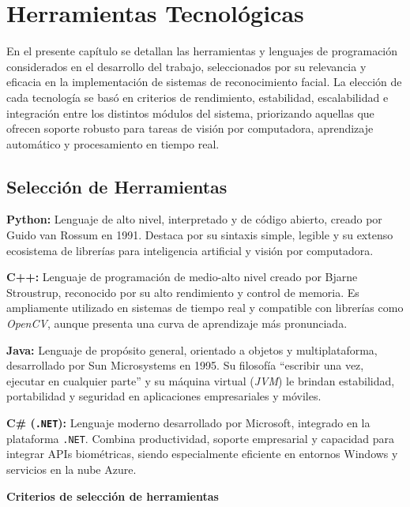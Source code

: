 \fancyhead{}
\fancyfoot{}
\cfoot{\thepage}



\chapter{Herramientas Tecnológicas}

En el presente capítulo se detallan las herramientas y lenguajes de programación considerados en el desarrollo del trabajo, seleccionados por su relevancia y eficacia en la implementación de sistemas de reconocimiento facial.  
La elección de cada tecnología se basó en criterios de rendimiento, estabilidad, escalabilidad e integración entre los distintos módulos del sistema, priorizando aquellas que ofrecen soporte robusto para tareas de visión por computadora, aprendizaje automático y procesamiento en tiempo real.   

\section{Selección de Herramientas}

\textbf{Python:} Lenguaje de alto nivel, interpretado y de código abierto, creado por Guido van Rossum en 1991. Destaca por su sintaxis simple, legible y su extenso ecosistema de librerías para inteligencia artificial y visión por computadora\cite{python}.

\textbf{C++:} Lenguaje de programación de medio-alto nivel creado por Bjarne Stroustrup, reconocido por su alto rendimiento y control de memoria. Es ampliamente utilizado en sistemas de tiempo real y compatible con librerías como \textit{OpenCV}, aunque presenta una curva de aprendizaje más pronunciada\cite{cppDocs}.

\textbf{Java:} Lenguaje de propósito general, orientado a objetos y multiplataforma, desarrollado por Sun Microsystems en 1995. Su filosofía “escribir una vez, ejecutar en cualquier parte” y su máquina virtual (\textit{JVM}) le brindan estabilidad, portabilidad y seguridad en aplicaciones empresariales y móviles\cite{javaDocs}.

\textbf{C\# (\texttt{.NET}):} Lenguaje moderno desarrollado por Microsoft, integrado en la plataforma \texttt{.NET}. Combina productividad, soporte empresarial y capacidad para integrar APIs biométricas, siendo especialmente eficiente en entornos Windows y servicios en la nube Azure\cite{csharpDocs}.


\textbf{Criterios de selección de herramientas}

